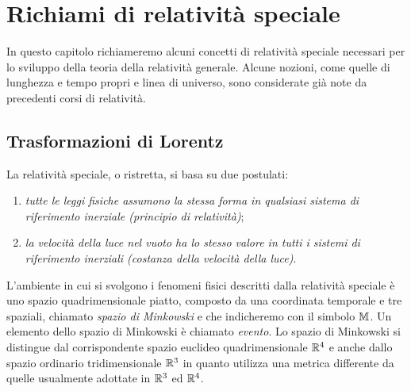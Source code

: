 \cleardoublepage
\chapter{Richiami di relatività speciale}
\label{cha:relativita-speciale}

In questo capitolo richiameremo alcuni concetti di relatività speciale necessari
per lo sviluppo della teoria della relatività generale.  Alcune nozioni, come
quelle di lunghezza e tempo propri e linea di universo, sono considerate già
note da precedenti corsi di relatività.

\section{Trasformazioni di Lorentz}
\label{sec:trasformazioni-lorentz}

La relatività speciale, o ristretta, si basa su due postulati:
\begin{enumerate}
\item\emph{tutte le leggi fisiche assumono la stessa forma in qualsiasi sistema
    di riferimento inerziale (principio di
    relatività)};
\item \emph{la velocità della luce nel vuoto ha lo stesso valore in tutti i
    sistemi di riferimento inerziali (costanza della velocità della luce)}.
\end{enumerate}

L'ambiente in cui si svolgono i fenomeni fisici descritti dalla relatività
speciale è uno spazio quadrimensionale piatto, composto da una coordinata
temporale e tre spaziali, chiamato 
\emph{spazio di Minkowski} e che indicheremo con il simbolo $\mathbb{M}$.  Un elemento
dello spazio di Minkowski è chiamato \emph{evento}.  Lo spazio di
Minkowski si distingue dal corrispondente spazio euclideo quadrimensionale
$\mathbb{R}^{4}$ e anche dallo spazio ordinario tridimensionale $\mathbb{R}^{3}$ in quanto
utilizza una metrica differente da quelle usualmente adottate in $\mathbb{R}^{3}$ ed
$\mathbb{R}^{4}$.

